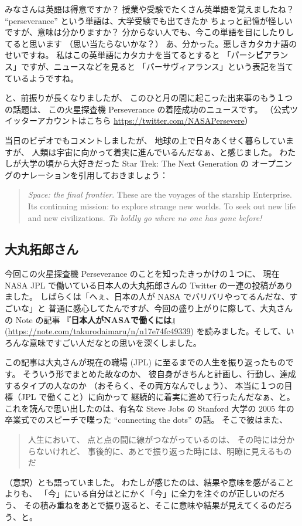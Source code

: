 \documentclass[dvipdfmx,autodetect-engine,10pt,b5paper,papersize,openany,dvipsnames]{jsbook}
\begin{document}
\begin{multicols}{2}
みなさんは英語は得意ですか？
授業や受験でたくさん英単語を覚えましたね？
``perseverance'' という単語は、大学受験でも出てきたか
ちょっと記憶が怪しいですが、意味は分かりますか？
分からない人でも、今この単語を目にしたりしてると思います
（思い当たらないかな？）
あ、分かった。悪しきカタカナ語のせいですね。
私はこの英単語にカタカナを当てるとすると
「パーシ{\bfseries ビ}アランス」ですが、ニュースなどを見ると
「パーサヴィアランス」という表記を当てているようですね。

と、前振りが長くなりましたが、
このひと月の間に起こった出来事のもう１つの話題は、
この火星探査機 Perseverance の着陸成功のニュースです。
（公式ツイッターアカウントはこちら \url{https://twitter.com/NASAPersevere}）

当日のビデオでもコメントしましたが、
地球の上で日々あくせく暮らしていますが、
人類は宇宙に向かって着実に進んでいるんだなぁ、と感じました。
わたしが大学の頃から大好きだった Star Trek: The Next Generation の
オープニングのナレーションを引用しておきましょう：
\begin{quotation}
  \noindent
  {\it Space: the final frontier}.
  These are the voyages of the starship Enterprise.
  Its continuing mission: to explore strange new worlds.
  To seek out new life and new civilizations.
  {\it To boldly go where no one has gone before!}
\end{quotation}


\subsection{大丸拓郎さん}
今回この火星探査機 Perseverance のことを知ったきっかけの１つに、
現在 NASA JPL で働いている日本人の大丸拓郎さんの Twitter の一連の投稿がありました。
しばらくは「へぇ、日本の人が NASA でバリバリやってるんだな、すごいな」と
普通に感心してたんですが、今回の盛り上がりに際して、大丸さんの Note の記事
『{\gtfamily\bfseries 日本人がNASAで働くには}』
(\url{https://note.com/takurodaimaru/n/n17e74fc49339})
を読みました。そして、いろんな意味ですごい人だなとの思いを深くしました。


この記事は大丸さんが現在の職場 (JPL) に至るまでの人生を振り返ったものです。
そういう形でまとめた故なのか、
彼自身がきちんと計画し、行動し、達成するタイプの人なのか
（おそらく、その両方なんでしょう）、
本当に１つの目標（JPL で働くこと）に向かって
継続的に着実に進めて行ったんだなぁ、と。
これを読んで思い出したのは、有名な Steve Jobs の Stanford 大学の
2005 年の卒業式でのスピーチで喋った ``connecting the dots'' の話。
そこで彼はまた、
\begin{quotation}
  \noindent
  人生において、
  点と点の間に線がつながっているのは、
  その時には分からないけれど、
  事後的に、あとで振り返った時には、明瞭に見えるものだ
\end{quotation}
（意訳）とも語っていました。
わたしが感じたのは、結果や意味を感がることよりも、
「今」にいる自分はとにかく「今」に全力を注ぐのが正しいのだろう、
その積み重ねをあとで振り返ると、そこに意味や結果が見えてくるのだろう、と。
    


\end{multicols}
\end{document}
